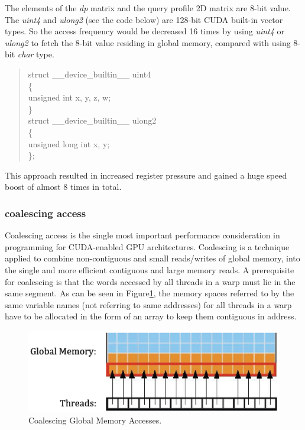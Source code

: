 The elements of the \emph{dp} matrix and the query profile 2D matrix are 8-bit value.  The \emph{uint4} and \emph{ulong2} (see the code below) are 128-bit CUDA built-in vector types. So the access frequency would be decreased 16 times by using \emph{uint4} or \emph{ulong2} to fetch the 8-bit value residing in global memory, compared with using 8-bit \emph{char} type.

\begin{quote}
\selectfont
struct \_\_device\_builtin\_\_ uint4\\
\{\\
   unsigned int x, y, z, w;\\
\}\\
struct \_\_device\_builtin\_\_ ulong2\\
\{\\
    unsigned long int x, y;\\
\};\\
\end{quote}

This approach resulted in increased register pressure and gained a huge speed boost of almost 8 times in total.

\subsubsection*{coalescing access}

Coalescing access is the single most important performance consideration in programming for CUDA-enabled GPU architectures. Coalescing is a technique applied to combine non-contiguous and small reads/writes of global memory, into the single and more efficient contiguous and large memory reads. A prerequisite for coalescing is that the words accessed by all threads in a warp must lie in the same segment. As can be seen in Figure\ref{fig:coalescing}, the memory spaces referred to by the same variable names (not referring to same addresses) for all threads in a warp have to be allocated in the form of an array to keep them contiguous in address.

\begin{figure}[!htb]
	\centering
	\includegraphics[totalheight=0.115\textheight]{Figures/coalesce.png}
	\caption{\selectfont Coalescing Global Memory Accesses\citep{Waters}.}
	\label{fig:coalescing}
\end{figure}

